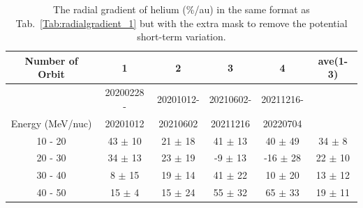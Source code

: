 \begin{table}[!htb]
    \centering

    \begin{tabular}{|c|c|c|c|c|c|}
    \hline
    Number of Orbit     & 1               & 2              & 3               & 4  & ave(1-3)\\
    \hline
                        &20200228 -      & 20201012-        & 20210602-    &  20211216-   &\\  
    Energy (MeV/nuc)    & 20201012        &  20210602       & 20211216      &  20220704  & \\
    \hline
    10 - 20 &  43 $\pm$ 10 & 21 $\pm$ 18 & 41 $\pm$ 13 & 40 $\pm$ 49  & 34 $\pm$ 8\\
    \hline
    20 - 30 &  34 $\pm$ 13 & 23 $\pm$ 19 & -9 $\pm$ 13 & -16 $\pm$ 28  & 22 $\pm$ 10\\
    \hline
    30 - 40 &  8 $\pm$ 15 & 19 $\pm$ 14 & 41 $\pm$ 22 & 10 $\pm$ 20 & 13 $\pm$ 12\\
    \hline
    40 - 50 &  15 $\pm$ 4 & 15 $\pm$ 24 & 55 $\pm$ 32 & 65 $\pm$ 33 & 19 $\pm$ 11\\
    \hline
    \end{tabular}
    \caption[Table of helium radial gradient with extra mask]{The radial gradient of helium (\%/au) in the same format as Tab.~\ref{Tab:radialgradient_1} but with the extra mask to remove the potential short-term variation. }
    \label{Tab:radialgradient_2}
\end{table}











%
